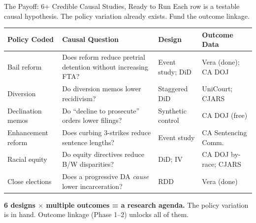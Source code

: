 \documentclass[aspectratio=169, 11pt]{beamer}
\newcommand{\smalltable}{\fontsize{6.5}{8.5}\selectfont}
\begin{document}
\begin{frame}{The Payoff: 6+ Credible Causal Studies, Ready to Run}
{\small Each row is a testable causal hypothesis. The policy variation already exists. Fund the outcome linkage.}
\vspace{4pt}
{\smalltable
\begin{tabularx}{\textwidth}{p{2.2cm}Xp{2.8cm}p{2.8cm}}
\toprule
\textbf{Policy Coded} & \textbf{Causal Question} & \textbf{Design} & \textbf{Outcome Data} \\
\midrule
Bail reform & Does reform reduce pretrial detention without increasing FTA? & Event study; DiD & Vera (\textcolor{medalistgreen}{done}); CA DOJ \\
Diversion & Do diversion memos lower recidivism? & Staggered DiD & UniCourt; CJARS \\
Declination memos & Do ``decline to prosecute'' orders lower filings? & Synthetic control & CA DOJ (\textcolor{medalistgreen}{free}) \\
Enhancement reform & Does curbing 3-strikes reduce sentence lengths? & Event study & CA Sentencing Comm. \\
Racial equity & Do equity directives reduce B/W disparities? & DiD; IV & CA DOJ by-race; CJARS \\
Close elections & Does a progressive DA \emph{cause} lower incarceration? & RDD & Vera (\textcolor{medalistgreen}{done}) \\
\bottomrule
\end{tabularx}}
\vspace{4pt}
\begin{alertblock}{}
\textbf{6 designs $\times$ multiple outcomes = a research agenda.} The policy variation is in hand. Outcome linkage (Phase 1--2) unlocks all of them.
\end{alertblock}
\end{frame}
\end{document}

